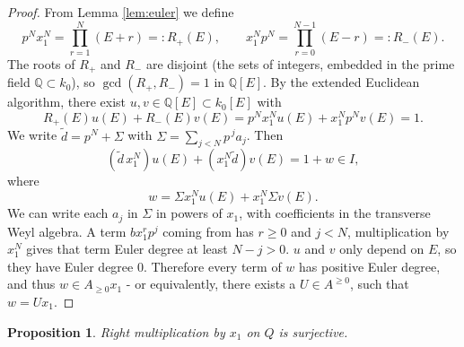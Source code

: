 \documentclass[11pt]{amsart}
\numberwithin{equation}{section}
\newtheorem{proposition}[theorem]{Proposition}
\theoremstyle{plain}
\theoremstyle{remark}
\begin{document}
\begin{proof}
From Lemma \ref{lem:euler} we define
\[p^Nx_1^N=\prod_{r=1}^N(E+r)=:R_+(E),\qquad
 x_1^Np^N=\prod_{r=0}^{N-1}(E-r)=:R_-(E).\]
The roots of $R_+$ and $R_-$ are disjoint (the sets  of integers, embedded in the prime field
$\mathbb Q\subset k_0$), so $\gcd(R_+,R_-)=1$ in $\mathbb Q[E]$. By the
extended Euclidean algorithm, there exist $u,v\in\mathbb Q[E]\subset
k_0[E]$ with
\[ R_+(E)u(E)+R_-(E)v(E)=p^Nx_1^Nu(E)+x_1^Np^Nv(E)=1.\]
We write $\tilde d=p^N+\Sigma$ with $\Sigma = \sum_{j<N}p^{\,j}a_j$. Then
\[(\tilde d\,x_1^N)u(E)+(x_1^N\tilde d)v(E)=1+w\in I,\]
where
\[w=\Sigma x_1^Nu(E)+x_1^N\Sigma v(E).\]
We can write each $a_j$ in $\Sigma$ in powers of $x_1$, with coefficients in the transverse Weyl algebra. A term $bx_1^rp^j$ coming from  has $r\geq0$ and $j<N$,  multiplication by $x_1^N$ gives that term Euler degree at least $N-j>0$. $u$ and $v$ only depend on $E$, so they have Euler degree 0. Therefore every term of $w$ has positive Euler degree, and thus $w\in A_{\geq0}x_1$  - or equivalently, there exists a $U\in A^{\geq0}$, such that $w=Ux_1$.
\end{proof}


\begin{proposition}\label{prop:x-surjective}
Right multiplication by $x_1$ on $Q$ is surjective.
\end{proposition}
\end{document}
